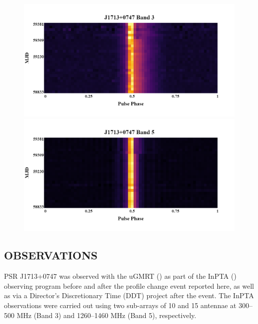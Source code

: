 \documentclass{article}
\begin{document}
\begin{figure}[htbp]
\centering
\begin{minipage}{.5\textwidth}
  \centering
  \includegraphics[width=\linewidth]{Images/Pulsar10.png}
\end{minipage}%
\begin{minipage}{.5\textwidth}
  \centering
  \includegraphics[width=\linewidth]{Images/Pulsar11.png}
\end{minipage}
\end{figure}

\subsection{OBSERVATIONS}
PSR J1713+0747 was observed with the uGMRT (\cite{Gupta+2017}) as part of the InPTA (\cite{JoshiAB+18}) observing program before and after the profile change event reported here, as well as via a Director’s Discretionary Time (DDT) project after the event. The InPTA observations were carried out using two sub-arrays of 10 and 15 antennae at 300–500 MHz (Band 3) and 1260–1460 MHz (Band 5), respectively.\\
\end{document}
